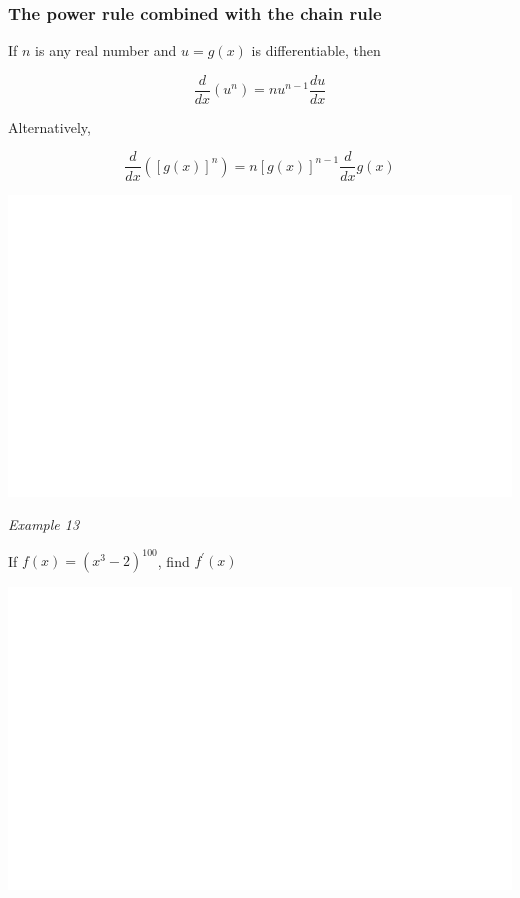 \documentclass[]{book}
\begin{document}
\hypertarget{the-power-rule-combined-with-the-chain-rule}{%
\subsubsection{The power rule combined with the chain rule}\label{the-power-rule-combined-with-the-chain-rule}}

If \(n\) is any real number and \(u=g(x)\) is differentiable, then

\[\frac{d}{dx}(u^n)= nu^{n-1}\frac{du}{dx}\]

Alternatively,

\[\frac{d}{dx}([g(x)]^n)= n[g(x)]^{n-1}\frac{d}{dx}g(x)\]

\begin{center}\includegraphics[width=1\linewidth]{figure/LB23-1} \end{center}

\emph{Example 13}

If \(f(x)=(x^3-2)^{100}\), find \(f^\prime(x)\)

\begin{center}\includegraphics[width=1\linewidth]{figure/LB24-1} \end{center}
\end{document}
